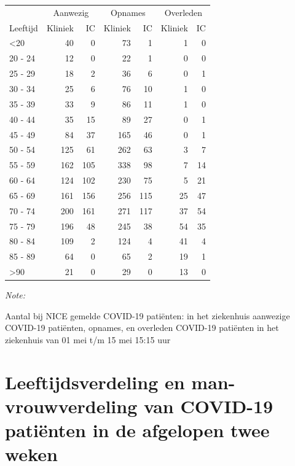 \documentclass[
  english,
  man,floatsintext]{apa6}
\begin{document}
\begin{table}
\centering\begingroup\fontsize{10}{12}\selectfont

\begin{threeparttable}
\begin{tabular}{lrrrrrr}
\toprule
\multicolumn{1}{c}{ } & \multicolumn{2}{c}{Aanwezig} & \multicolumn{2}{c}{Opnames} & \multicolumn{2}{c}{Overleden} \\
\cmidrule(l{3pt}r{3pt}){2-3} \cmidrule(l{3pt}r{3pt}){4-5} \cmidrule(l{3pt}r{3pt}){6-7}
Leeftijd & Kliniek & IC & Kliniek & IC & Kliniek & IC\\
\midrule
<20 & 40 & 0 & 73 & 1 & 1 & 0\\
20 - 24 & 12 & 0 & 22 & 1 & 0 & 0\\
25 - 29 & 18 & 2 & 36 & 6 & 0 & 1\\
30 - 34 & 25 & 6 & 76 & 10 & 1 & 0\\
35 - 39 & 33 & 9 & 86 & 11 & 1 & 0\\
40 - 44 & 35 & 15 & 89 & 27 & 0 & 1\\
45 - 49 & 84 & 37 & 165 & 46 & 0 & 1\\
50 - 54 & 125 & 61 & 262 & 63 & 3 & 7\\
55 - 59 & 162 & 105 & 338 & 98 & 7 & 14\\
60 - 64 & 124 & 102 & 230 & 75 & 5 & 21\\
65 - 69 & 161 & 156 & 256 & 115 & 25 & 47\\
70 - 74 & 200 & 161 & 271 & 117 & 37 & 54\\
75 - 79 & 196 & 48 & 245 & 38 & 54 & 35\\
80 - 84 & 109 & 2 & 124 & 4 & 41 & 4\\
85 - 89 & 64 & 0 & 65 & 2 & 19 & 1\\
>90 & 21 & 0 & 29 & 0 & 13 & 0\\
\bottomrule
\end{tabular}
\begin{tablenotes}
\item \textit{Note: } 
\item Aantal bij NICE gemelde COVID-19 patiënten: in het ziekenhuis aanwezige COVID-19 patiënten, opnames, en overleden COVID-19 patiënten in het ziekenhuis van 01 mei t/m 15 mei 15:15 uur
\end{tablenotes}
\end{threeparttable}
\endgroup{}
\end{table}

\newpage

\hypertarget{leeftijdsverdeling-en-man-vrouwverdeling-van-covid-19-patiuxebnten-in-de-afgelopen-twee-weken}{%
\section{Leeftijdsverdeling en man-vrouwverdeling van COVID-19 patiënten in de afgelopen twee weken}\label{leeftijdsverdeling-en-man-vrouwverdeling-van-covid-19-patiuxebnten-in-de-afgelopen-twee-weken}}
\end{document}
